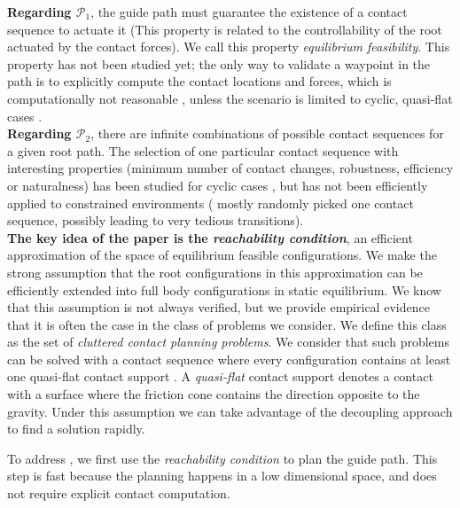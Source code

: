 \noindent \textbf{Regarding $\mathcal{P}_1$}, the guide path must guarantee the existence of a contact sequence to actuate it (This property is related to the controllability of the root actuated by the contact forces). We call this property \textit{equilibrium feasibility}. This property has not been studied yet; the only way to validate a waypoint in the path is to explicitly compute the contact locations and forces, which is computationally not reasonable \citep{Bouyarmane2009}, unless the scenario is limited to cyclic, quasi-flat cases \citep{zucker2010optimization}. \\

\noindent \textbf{Regarding $\mathcal{P}_2$}, there are infinite combinations of possible contact sequences for a given root path. The selection of one particular contact sequence with interesting properties (minimum number of contact changes, robustness, efficiency or naturalness) has been studied for cyclic cases \citep{Hauser06usingmotion}, but has not been efficiently applied to constrained environments (\citeauthor{bouyarmane:lirmm-00777727, DBLP:conf/iser/EscandeKMG08} mostly randomly picked one contact sequence, possibly leading to very tedious transitions).  \\

\textbf{The key idea of the paper is the \textit{reachability condition}}, an efficient approximation of the space of \gls{equilibrium feasible} configurations.
We make the strong assumption that the root configurations in this approximation can be efficiently extended into full body configurations in static equilibrium.
We know that this assumption is not always verified, but we provide empirical evidence that it is often
the case in the class of problems we consider. We define this class as the set of \textit{\gls{cluttered} contact planning problems}.
We consider that such problems can be solved with a contact sequence 
where every configuration contains at least one \gls{quasi-flat} contact support \citep{Prete2016}. A \textit{quasi-flat} contact support denotes a contact
with a surface where the friction cone contains the direction opposite to the gravity. 
Under this assumption we can take advantage of the decoupling approach to find a solution rapidly.

To address \Pa, we first use the \textit{reachability condition} to plan the guide path. This step is fast because the planning happens
in a low dimensional space, and does not require explicit contact computation.

